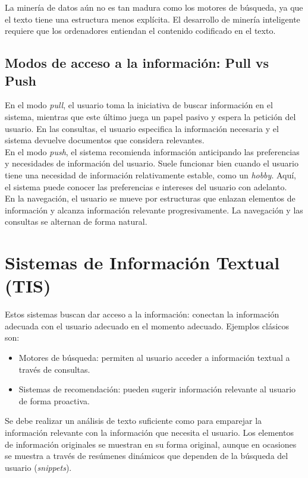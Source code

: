 La minería de datos aún no es tan madura como los motores de búsqueda, ya que el texto tiene una estructura menos explícita. El desarrollo de minería inteligente requiere que los ordenadores entiendan el contenido codificado en el texto. 

\subsection{Modos de acceso a la información: Pull vs Push}

En el modo \textit{pull}, el usuario toma la iniciativa de buscar información en el sistema, mientras que este último juega un papel pasivo y espera la petición del usuario. En las consultas, el usuario especifica la información necesaria y el sistema devuelve documentos que considera relevantes. \\

En el modo \textit{push}, el sistema recomienda información anticipando las preferencias y necesidades de información del usuario. Suele funcionar bien cuando el usuario tiene una necesidad de información relativamente estable, como un \textit{hobby}. Aquí, el sistema puede conocer las preferencias e intereses del usuario con adelanto. \\

En la navegación, el usuario se mueve por estructuras que enlazan elementos de información y alcanza información relevante progresivamente. La navegación y las consultas se alternan de forma natural. 

\section{Sistemas de Información Textual (TIS)}

Estos sistemas buscan dar acceso a la información: conectan la información adecuada con el usuario adecuado en el momento adecuado. Ejemplos clásicos son:
\begin{itemize}
\item Motores de búsqueda: permiten al usuario acceder a información textual a través de consultas.
\item Sistemas de recomendación: pueden sugerir información relevante al usuario de forma proactiva. 
\end{itemize}

Se debe realizar un análisis de texto suficiente como para emparejar la información relevante con la información que necesita el usuario. Los elementos de información originales se muestran en su forma original, aunque en ocasiones se muestra a través de resúmenes dinámicos que dependen de la búsqueda del usuario (\textit{snippets}).

